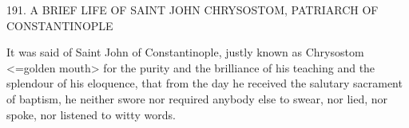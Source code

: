 191.
A BRIEF LIFE OF SAINT JOHN CHRYSOSTOM,
PATRIARCH OF CONSTANTINOPLE

It was said of Saint John of Constantinople, justly known as
Chrysostom <=golden mouth> for the purity and the brilliance of
his teaching and the splendour of his eloquence, that from the day
he received the salutary sacrament of baptism, he neither swore nor
required anybody else to swear, nor lied, nor spoke, nor listened to
witty words.

